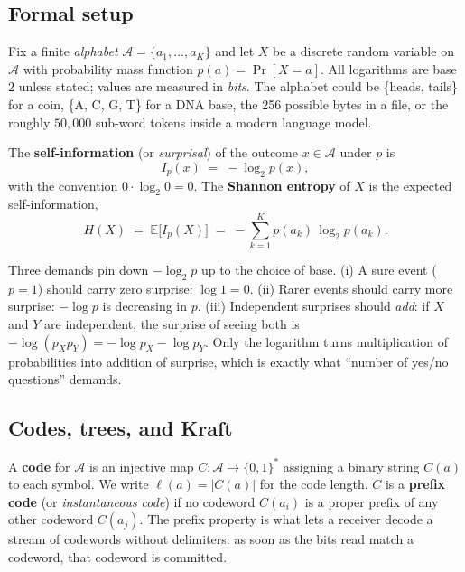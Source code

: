 \subsection*{Formal setup}

Fix a finite \emph{alphabet} $\mathcal{A} = \{a_1, \dots, a_K\}$ and
let $X$ be a discrete random variable on $\mathcal{A}$ with
probability mass function $p(a) = \Pr[X = a]$. All logarithms are
base $2$ unless stated; values are measured in \emph{bits}. The
alphabet could be \{heads, tails\} for a coin, \{A, C, G, T\} for a
DNA base, the 256 possible bytes in a file, or the roughly $50{,}000$
sub-word tokens inside a modern language model.

\begin{definition}
\label{def:entropy}
The \textbf{self-information} (or \emph{surprisal}) of the outcome
$x \in \mathcal{A}$ under $p$ is
\begin{equation}
  I_p(x) \;=\; -\log_2 p(x),
  \label{eq:self-info}
\end{equation}
with the convention $0 \cdot \log_2 0 = 0$. The \textbf{Shannon
entropy} of $X$ is the expected self-information,
\begin{equation}
  H(X) \;=\; \mathbb{E}\bigl[I_p(X)\bigr]
       \;=\; -\sum_{k=1}^{K} p(a_k)\,\log_2 p(a_k).
  \label{eq:entropy}
\end{equation}
\end{definition}

\begin{aside}
Three demands pin down $-\log_2 p$ up to the choice of base.
(i) A sure event ($p=1$) should carry zero surprise: $\log 1 = 0$.
(ii) Rarer events should carry more surprise: $-\log p$ is decreasing
in $p$. (iii) Independent surprises should \emph{add}: if $X$ and
$Y$ are independent, the surprise of seeing both is
$-\log(p_X p_Y) = -\log p_X - \log p_Y$. Only the logarithm turns
multiplication of probabilities into addition of surprise, which is
exactly what ``number of yes/no questions'' demands.
\end{aside}

\subsection*{Codes, trees, and Kraft}

A \textbf{code} for $\mathcal{A}$ is an injective map
$C : \mathcal{A} \to \{0,1\}^*$ assigning a binary string $C(a)$ to
each symbol. We write $\ell(a) = |C(a)|$ for the code length. $C$
is a \textbf{prefix code} (or \emph{instantaneous code}) if no
codeword $C(a_i)$ is a proper prefix of any other codeword $C(a_j)$.
The prefix property is what lets a receiver decode a stream of
codewords without delimiters: as soon as the bits read match a
codeword, that codeword is committed.


